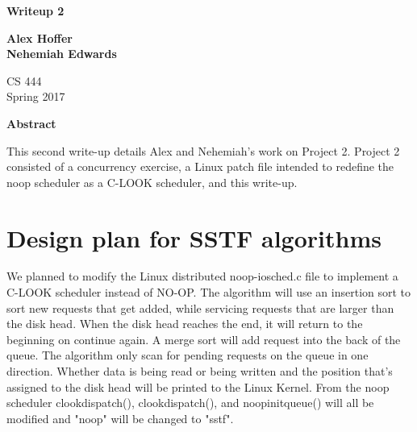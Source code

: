 \documentclass[letterpaper,10pt,titlepage]{article}
\begin{document}
\begin{titlepage}
    \begin{center}
        \vspace*{3.5cm}

        \textbf{Writeup 2}

        \vspace{0.5cm}

        \textbf{Alex Hoffer\\}
	\textbf{Nehemiah Edwards}

        \vspace{0.8cm}

        CS 444\\
        Spring 2017\\

        \vspace{1cm}

        \textbf{Abstract}\\

        \vspace{0.5cm}

	This second write-up details Alex and Nehemiah's work on Project 2. Project 2 consisted of a concurrency exercise, a Linux patch file intended to redefine the noop scheduler as a C-LOOK scheduler, and this write-up. 


        \vfill

    \end{center}
\end{titlepage}

\newpage

\tableofcontents

\newpage

\section{Design plan for SSTF algorithms}
We planned to modify the Linux distributed noop-iosched.c file to implement a C-LOOK scheduler instead of NO-OP. The algorithm will use an insertion sort to sort new requests that get added, while servicing requests that are larger than the disk head. When the disk head reaches the end, it will return to the beginning on continue again. A merge sort will add request into the back of the queue. The algorithm only scan for pending requests on the queue in one direction. Whether data is being read or being written and the position that's assigned to the disk head will be printed to the Linux Kernel. From the noop scheduler clook\textunderscore dispatch(), clook\textunderscore dispatch(), and noop\textunderscore init\textunderscore queue() will all be modified and "noop" will be changed to "sstf". 
\end{document}
